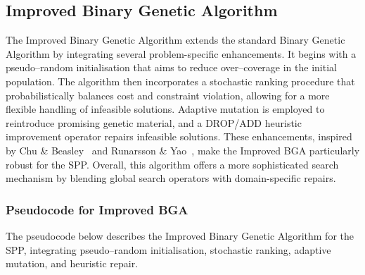 \documentclass[12pt]{article}
\begin{document}
\subsection{Improved Binary Genetic Algorithm}
The Improved Binary Genetic Algorithm extends the standard Binary Genetic Algorithm by integrating several problem-specific enhancements. It begins with a pseudo–random initialisation that aims to reduce over–coverage in the initial population. The algorithm then incorporates a stochastic ranking procedure that probabilistically balances cost and constraint violation, allowing for a more flexible handling of infeasible solutions. Adaptive mutation is employed to reintroduce promising genetic material, and a DROP/ADD heuristic improvement operator repairs infeasible solutions. These enhancements, inspired by Chu \& Beasley~\cite{ChuAndBeasley1998} and Runarsson \& Yao~\cite{RunarssonYao2000}, make the Improved BGA particularly robust for the SPP. Overall, this algorithm offers a more sophisticated search mechanism by blending global search operators with domain-specific repairs.

\subsubsection{Pseudocode for Improved BGA}
The pseudocode below describes the Improved Binary Genetic Algorithm for the SPP, integrating pseudo–random initialisation, stochastic ranking, adaptive mutation, and heuristic repair.
\end{document}
